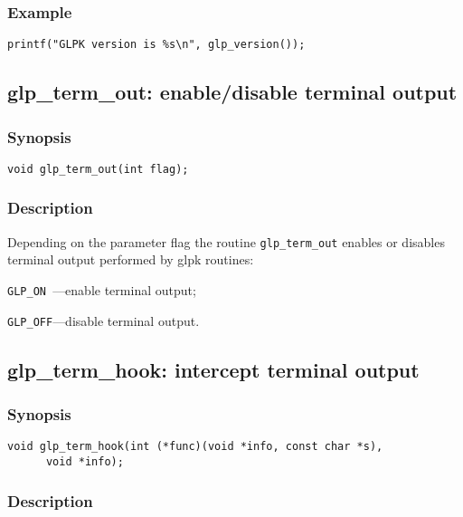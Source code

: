 \newpage

\subsubsection*{Example}

\begin{verbatim}
printf("GLPK version is %s\n", glp_version());
\end{verbatim}

\subsection{glp\_term\_out: enable/disable terminal output}

\subsubsection*{Synopsis}

\begin{verbatim}
void glp_term_out(int flag);
\end{verbatim}

\subsubsection*{Description}

Depending on the parameter flag the routine \verb|glp_term_out| enables
or disables terminal output performed by glpk routines:

\verb|GLP_ON |---enable terminal output;

\verb|GLP_OFF|---disable terminal output.

\subsection{glp\_term\_hook: intercept terminal output}

\subsubsection*{Synopsis}

\begin{verbatim}
void glp_term_hook(int (*func)(void *info, const char *s),
      void *info);
\end{verbatim}

\subsubsection*{Description}

